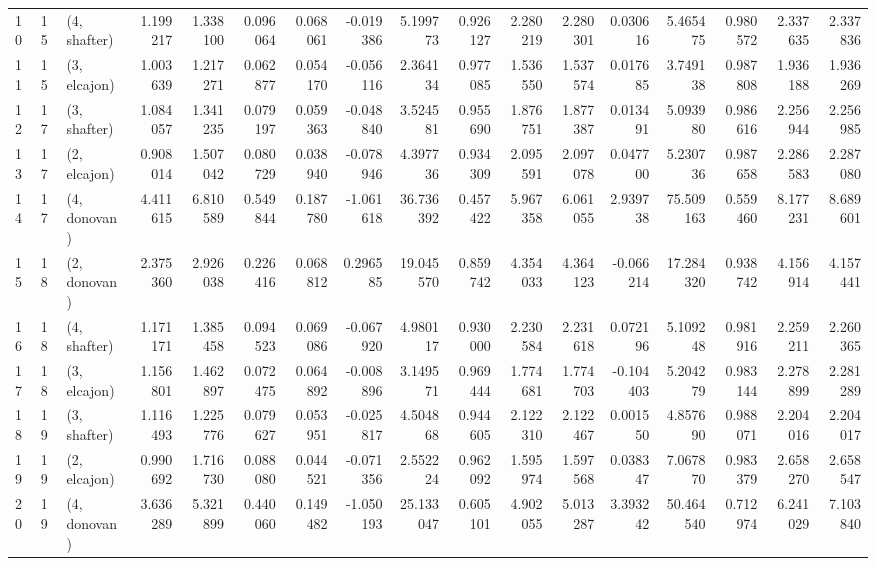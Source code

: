 \begin{tabular}{lllrrrrrrrrrrrrrr}
10 &    15 &  (4, shafter) &  1.199217 &  1.338100 &   0.096064 &  0.068061 & -0.019386 &   5.199773 &  0.926127 &   2.280219 &  2.280301 &  0.030616 &   5.465475 &  0.980572 &  2.337635 &  2.337836 \\
11 &    15 &  (3, elcajon) &  1.003639 &  1.217271 &   0.062877 &  0.054170 & -0.056116 &   2.364134 &  0.977085 &   1.536550 &  1.537574 &  0.017685 &   3.749138 &  0.987808 &  1.936188 &  1.936269 \\
12 &    17 &  (3, shafter) &  1.084057 &  1.341235 &   0.079197 &  0.059363 & -0.048840 &   3.524581 &  0.955690 &   1.876751 &  1.877387 &  0.013491 &   5.093980 &  0.986616 &  2.256944 &  2.256985 \\
13 &    17 &  (2, elcajon) &  0.908014 &  1.507042 &   0.080729 &  0.038940 & -0.078946 &   4.397736 &  0.934309 &   2.095591 &  2.097078 &  0.047700 &   5.230736 &  0.987658 &  2.286583 &  2.287080 \\
14 &    17 &  (4, donovan) &  4.411615 &  6.810589 &   0.549844 &  0.187780 & -1.061618 &  36.736392 &  0.457422 &   5.967358 &  6.061055 &  2.939738 &  75.509163 &  0.559460 &  8.177231 &  8.689601 \\
15 &    18 &  (2, donovan) &  2.375360 &  2.926038 &   0.226416 &  0.068812 &  0.296585 &  19.045570 &  0.859742 &   4.354033 &  4.364123 & -0.066214 &  17.284320 &  0.938742 &  4.156914 &  4.157441 \\
16 &    18 &  (4, shafter) &  1.171171 &  1.385458 &   0.094523 &  0.069086 & -0.067920 &   4.980117 &  0.930000 &   2.230584 &  2.231618 &  0.072196 &   5.109248 &  0.981916 &  2.259211 &  2.260365 \\
17 &    18 &  (3, elcajon) &  1.156801 &  1.462897 &   0.072475 &  0.064892 & -0.008896 &   3.149571 &  0.969444 &   1.774681 &  1.774703 & -0.104403 &   5.204279 &  0.983144 &  2.278899 &  2.281289 \\
18 &    19 &  (3, shafter) &  1.116493 &  1.225776 &   0.079627 &  0.053951 & -0.025817 &   4.504868 &  0.944605 &   2.122310 &  2.122467 &  0.001550 &   4.857690 &  0.988071 &  2.204016 &  2.204017 \\
19 &    19 &  (2, elcajon) &  0.990692 &  1.716730 &   0.088080 &  0.044521 & -0.071356 &   2.552224 &  0.962092 &   1.595974 &  1.597568 &  0.038347 &   7.067870 &  0.983379 &  2.658270 &  2.658547 \\
20 &    19 &  (4, donovan) &  3.636289 &  5.321899 &   0.440060 &  0.149482 & -1.050193 &  25.133047 &  0.605101 &   4.902055 &  5.013287 &  3.393242 &  50.464540 &  0.712974 &  6.241029 &  7.103840 \\

\end{tabular}
